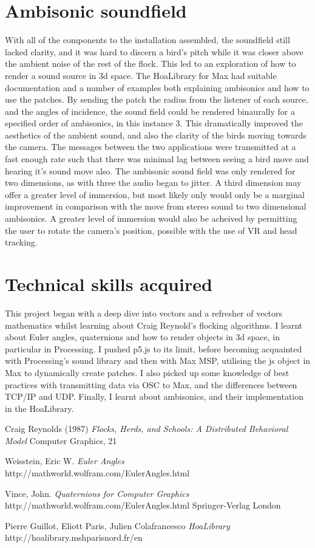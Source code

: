 \documentclass[journal, a4paper]{IEEEtran}
\begin{document}
\section*{Ambisonic soundfield}
With all of the components to the installation assembled, the soundfield still lacked clarity, and it was hard to discern a bird's pitch while it was closer above the ambient noise of the rest of the flock. This led to an exploration of how to render a sound source in 3d space. The HoaLibrary \cite{hoa} for Max had suitable documentation and a number of examples both explaining ambisonics and how to use the patches. By sending the patch the radius from the listener of each source, and the angles of incidence, the sound field could be rendered binaurally for a specified order of ambisonics, in this instance 3. This dramatically improved the aesthetics of the ambient sound, and also the clarity of the birds moving towards the camera. The messages between the two applications were transmitted at a fast enough rate such that there was minimal lag between seeing a bird move and hearing it's sound move also.
The ambisonic sound field was only rendered for two dimensions, as with three the audio began to jitter. A third dimension may offer a greater level of immersion, but most likely only would only be a marginal improvement in comparison with the move from stereo sound to two dimensional ambisonics. A greater level of immersion would also be acheived by permitting the user to rotate the camera's position, possible with the use of VR and head tracking.

\section*{Technical skills acquired}
This project began with a deep dive into vectors and a refresher of vectors mathematics whilst learning about Craig Reynold's flocking algorithms. I learnt about Euler angles, quaternions and how to render objects in 3d space, in particular in Processing. I pushed p5.js to its limit, before becoming acquainted with Processing's sound library and then with Max MSP, utilising the js object in Max to dynamically create patches. I also picked up some knowledge of best practices with transmitting data via OSC to Max, and the differences between TCP/IP and UDP. Finally, I learnt about ambisonics, and their implementation in the HoaLibrary.


\begin{thebibliography}{1}

Craig Reynolds (1987)
\textit{Flocks, Herds, and Schools: A Distributed Behavioral Model}
Computer Graphics, 21

Weisstein, Eric W.
\textit{Euler Angles}
http://mathworld.wolfram.com/EulerAngles.html


Vince, John.
\textit{Quaternions for Computer Graphics}
http://mathworld.wolfram.com/EulerAngles.html
Springer-Verlag London

Pierre Guillot, Eliott Paris, Julien Colafrancesco
\textit{HoaLibrary}
http://hoalibrary.mshparisnord.fr/en

\end{thebibliography}
\end{document}
